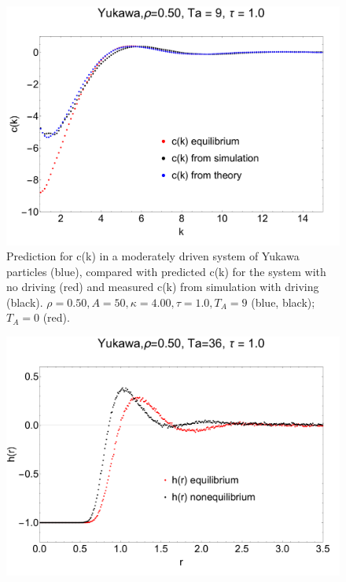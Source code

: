 \documentclass[amsmath,preprintnumbers,10pt,nofootinbib,prl,twocolumn]{revtex4-1}
\begin{document}
\begin{figure}
    \centering
    \includegraphics[scale=0.25, clip=True]{YukawaCk_Yp0.5_Pe3_U1.00.pdf}
    \caption{Prediction for c(k) in a moderately driven system of Yukawa particles (blue), compared with predicted c(k) for the system with no driving (red) and measured c(k) from simulation with driving (black). $\rho = 0.50, A = 50, \kappa = 4.00, \tau = 1.0, T_A = 9$ (blue, black); $T_A = 0$ (red).}
    \label{Fig:n}
\end{figure}

\begin{figure}
    \centering
    \includegraphics[scale=0.25, clip=True]{Yukawahr_Yp0.5_Pe6_U1.00.pdf}
    \caption{}
    \label{Fig:n}
\end{figure}
\end{document}
